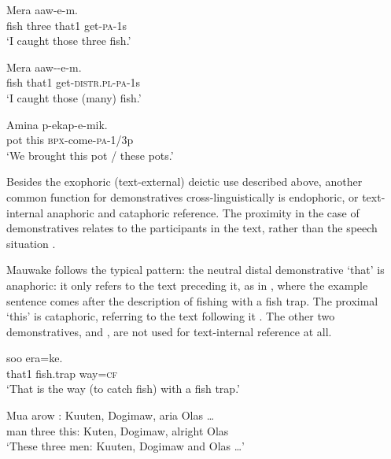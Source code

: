 \ea%
\label{ex:3:x636}
\gll Mera   aaw-e-m. \\
fish three that1 get-\textsc{pa}-1s\\
\glt`I caught those three fish.'
\z

\ea%
\label{ex:3:x637}
\gll Mera  aaw--e-m. \\
fish that1 get-\textsc{distr}.\textsc{pl}-\textsc{pa}-1s\\
\glt`I caught those (many) fish.'
\z

\ea%
\label{ex:3:x638}
\gll Amina  p-ekap-e-mik. \\
pot this \textsc{bpx}-come-\textsc{pa}-1/3p\\
\glt`We brought this pot / these pots.'
\z

Besides the exophoric (text-external) deictic use described above, another common function for demonstratives cross-linguistically is endophoric, or text-internal anaphoric and cataphoric reference. The proximity in the case of demonstratives relates to the participants in the text, rather than the speech situation \citep[278]{Lyons1968}. 

Mauwake follows the typical pattern: the neutral distal demonstrative  `that' is anaphoric: it only refers to the text preceding it, as in , where the example sentence comes after the description of fishing with a fish trap. The proximal  `this' is cataphoric, referring to the text following it . The other two demonstratives,  and , are not used for text-internal reference at all.

\ea%
\label{ex:3:x639}
\gll {} soo era=ke. \\
that1 fish.trap way=\textsc{cf}\\
\glt`That is the way (to catch fish) with a fish trap.'
\z

\ea%
\label{ex:3:x640}
\gll Mua arow : Kuuten, Dogimaw, aria Olas {\dots} \\
man three this: Kuten, Dogimaw, alright Olas\\
\glt`These three men: Kuuten, Dogimaw and Olas {\dots}'
\z

